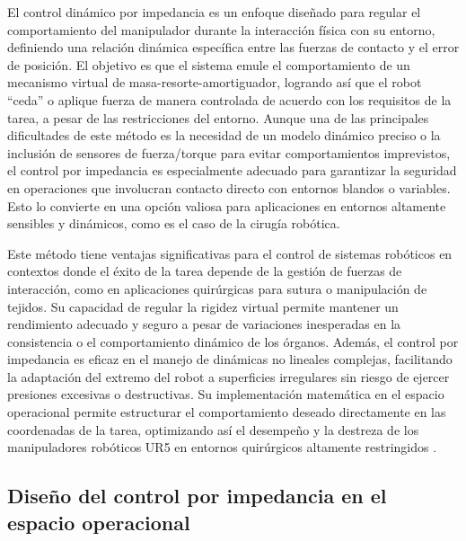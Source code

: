 
El control dinámico por impedancia es un enfoque diseñado para regular el
comportamiento del manipulador durante la interacción física con su entorno,
definiendo una relación dinámica específica entre las fuerzas de contacto y el
error de posición. El objetivo es que el sistema emule el comportamiento de un
mecanismo virtual de masa-resorte-amortiguador, logrando así que el robot
``ceda'' o aplique fuerza de manera controlada de acuerdo con los requisitos de
la tarea, a pesar de las restricciones del entorno. Aunque una de las
principales dificultades de este método es la necesidad de un modelo dinámico
preciso o la inclusión de sensores de fuerza/torque para evitar comportamientos
imprevistos, el control por impedancia es especialmente adecuado para
garantizar la seguridad en operaciones que involucran contacto directo con
entornos blandos o variables. Esto lo convierte en una opción valiosa para
aplicaciones en entornos altamente sensibles y dinámicos, como es el caso de la
cirugía robótica.

Este método tiene ventajas significativas para el control de sistemas robóticos
en contextos donde el éxito de la tarea depende de la gestión de fuerzas de
interacción, como en aplicaciones quirúrgicas para sutura o manipulación de
tejidos. Su capacidad de regular la rigidez virtual permite mantener un
rendimiento adecuado y seguro a pesar de variaciones inesperadas en la
consistencia o el comportamiento dinámico de los órganos. Además, el control
por impedancia es eficaz en el manejo de dinámicas no lineales complejas,
facilitando la adaptación del extremo del robot a superficies irregulares sin
riesgo de ejercer presiones excesivas o destructivas. Su implementación
matemática en el espacio operacional permite estructurar el comportamiento
deseado directamente en las coordenadas de la tarea, optimizando así el
desempeño y la destreza de los manipuladores robóticos UR5 en entornos
quirúrgicos altamente restringidos \cite{hogan_impedance_control}.

\subsection{Diseño del control por impedancia en el espacio operacional}


